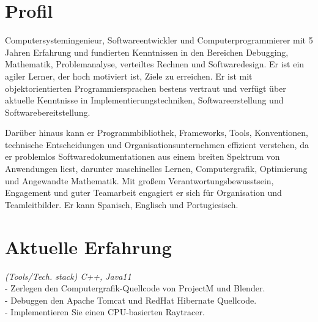 \documentclass[]{CV-JuanCamiloFlorez}
\begin{document}
\begin{minipage}[t]{0.66\textwidth} 


\section{Profil}
\parindent=20pt Computersystemingenieur, Softwareentwickler und Computerprogrammierer mit 5 Jahren Erfahrung und fundierten Kenntnissen in den Bereichen Debugging, Mathematik, Problemanalyse, verteiltes Rechnen und Softwaredesign. Er ist ein agiler Lerner, der hoch motiviert ist, Ziele zu erreichen. Er ist mit objektorientierten Programmiersprachen bestens vertraut und verfügt über aktuelle Kenntnisse in Implementierungstechniken, Softwareerstellung und Softwarebereitstellung.

\parindent=20pt Darüber hinaus kann er Programmbibliothek, Frameworks, Tools, Konventionen, technische Entscheidungen und Organisationsunternehmen effizient verstehen, da er problemlos Softwaredokumentationen aus einem breiten Spektrum von Anwendungen liest, darunter maschinelles Lernen, Computergrafik, Optimierung und Angewandte Mathematik. Mit großem Verantwortungsbewusstsein, Engagement und guter Teamarbeit engagiert er sich für Organisation und Teamleitbilder. Er kann Spanisch, Englisch und Portugiesisch.

\sectionsep

\section{Aktuelle Erfahrung}
    \noindent
    \textit{(Tools/Tech. stack) C++, Java11} \\
        - Zerlegen den Computergrafik-Quellcode von ProjectM und Blender. \\
        - Debuggen den Apache Tomcat und RedHat Hibernate Quellcode. \\
        - Implementieren Sie einen CPU-basierten Raytracer. \\
        \sectionsep


\end{minipage}
\end{document}
